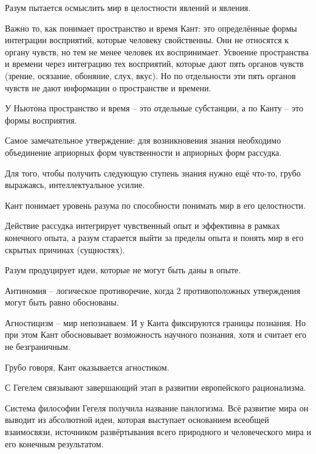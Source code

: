 \documentclass[main.tex]{subfiles}
\begin{document}
Разум пытается осмыслить мир в целостности явлений и явления.

Важно то, как понимает пространство и время Кант: это определённые формы интеграции восприятий, которые человеку свойственны.
Они не относятся к органу чувств, но тем не менее человек их воспринимает.
Усвоение пространства и времени через интеграцию тех восприятий, которые дают пять органов чувств (зрение, осязание, обоняние, слух, вкус).
Но по отдельности эти пять органов чувств не дают информации о пространстве и времени.

У Ньютона пространство и время -- это отдельные субстанции, а по Канту -- это формы восприятия.

Самое замечательное утверждение: для возникновения знания необходимо объединение априорных форм чувственности и априорных форм рассудка.

Для того, чтобы получить следующую ступень знания нужно ещё что-то, грубо выражаясь, интеллектуальное усилие.



Кант понимает уровень разума по способности понимать мир в его целостности.

Действие рассудка интегрирует чувственный опыт и эффективна в рамках конечного опыта, а разум старается выйти за пределы опыта и понять мир в его скрытых причинах (сущностях).

Разум продуцирует идеи, которые не могут быть даны в опыте.

Антиномия -- логическое противоречие, когда 2 противоположных утверждения могут быть равно обоснованы.



Агностицизм -- мир непознаваем.
И у Канта фиксируются границы познания.
Но при этом Кант обосновывает возможность научного познания, хотя и считает его не безграничным.

Грубо говоря, Кант оказывается агностиком.



С Гегелем связывают завершающий этап в развитии европейского рационализма.

Система философии Гегеля получила название панлогизма.
Всё развитие мира он выводит из абсолютной идеи, которая выступает основанием всеобщей взаимосвязи, источником развёртывания всего природного и человеческого мира и его конечным результатом.
\end{document}
